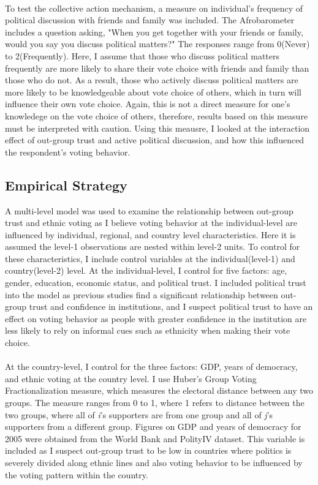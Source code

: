 \documentclass[a4paper, 12pt]{article}
\begin{document}
\paragraph{}
To test the collective action mechanism, a measure on individual's frequency of political discussion with friends and family was included. The Afrobarometer includes a question asking, "When you get together with your friends or family, would you say you discuss political matters?" The responses range from 0(Never) to 2(Frequently). Here, I assume that those who discuss political matters frequently are more likely to share their vote choice with friends and family than those who do not. As a result, those who actively discuss political matters are more likely to be knowledgeable about vote choice of others, which in turn will influence their own vote choice. Again, this is not a direct measure for one's knowledege on the vote choice of others, therefore, results based on this measure must be interpreted with caution. Using this meausre, I looked at the interaction effect of out-group trust and active political discussion, and how this influenced the respondent's voting behavior. 

\subsection{Empirical Strategy}
A multi-level model was used to examine the relationship between out-group trust and ethnic voting as I believe voting behavior at the individual-level are influenced by individual, regional, and country level characteristics. Here it is assumed the level-1 observations are nested within level-2 units. To control for these characteristics, I include control variables at the individual(level-1) and country(level-2) level. At the individual-level, I control for five factors: age, gender, education, economic status, and political trust. I included political trust into the model as previous studies find a significant relationship between out-group trust and confidence in institutions\cite{caoIngroupOutgroupForms2015}, and I suspect political trust to have an effect on voting behavior as people with greater confidence in the institution are less likely to rely on informal cues such as ethnicity when making their vote choice.
\paragraph{}
At the country-level, I control for the three factors: GDP, years of democracy, and ethnic voting at the country level. I use Huber's\cite{huberMeasuringEthnicVoting2012} Group Voting Fractionalization measure, which measures the electoral distance between any two groups. The measure ranges from 0 to 1, where 1 refers to distance between the two groups, where all of \textit{i}'s supporters are from one group and all of \textit{j}'s supporters from a different group. Figures on GDP and years of democracy for 2005 were obtained from the World Bank and PolityIV dataset. This variable is included as I suspect out-group trust to be low in countries where politics is severely divided along ethnic lines and also voting behavior to be influenced by the voting pattern within the country.
\end{document}
